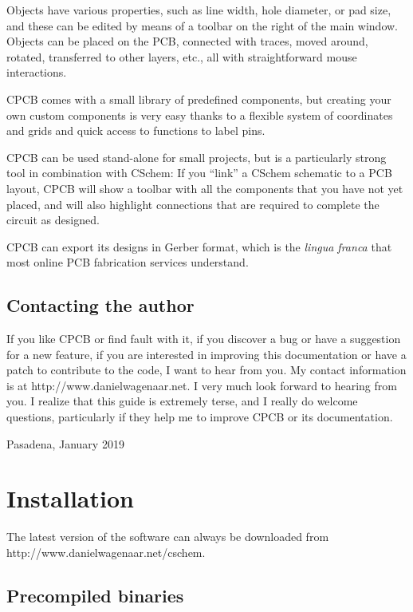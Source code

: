 \documentclass[11pt]{report}
\begin{document}
Objects have various properties, such as line width, hole diameter, or
pad size, and these can be edited by means of a toolbar on the right
of the main window. Objects can be placed on the PCB, connected with
traces, moved around, rotated, transferred to other layers, etc., all
with straightforward mouse interactions.

CPCB comes with a small library of predefined components, but creating
your own custom components is very easy thanks to a flexible system of
coordinates and grids and quick access to functions to label pins.

CPCB can be used stand-alone for small projects, but is a particularly
strong tool in combination with CSchem: If you ``link'' a CSchem
schematic to a PCB layout, CPCB will show a toolbar with all the
components that you have not yet placed, and will also highlight
connections that are required to complete the circuit as designed.

CPCB can export its designs in Gerber format, which is the
\emph{lingua franca} that most online PCB fabrication services
understand.

\section{Contacting the author}

If you like CPCB or find fault with it, if you discover a bug or have a
suggestion for a new feature, if you are interested in improving this
documentation or have a patch to contribute to the code, I want to
hear from you. My contact information is at
http://www.danielwagenaar.net. I very much look forward to hearing
from you. I realize that this guide is extremely terse, and I
really do welcome questions, particularly if they help me to improve
CPCB or its documentation.\bigskip

\noindent Pasadena, January 2019

\chapter{Installation}\label{ch.install}

The latest version of the software can always be downloaded from\break
http://www.danielwagenaar.net/cschem.

\section{Precompiled binaries}
\end{document}
